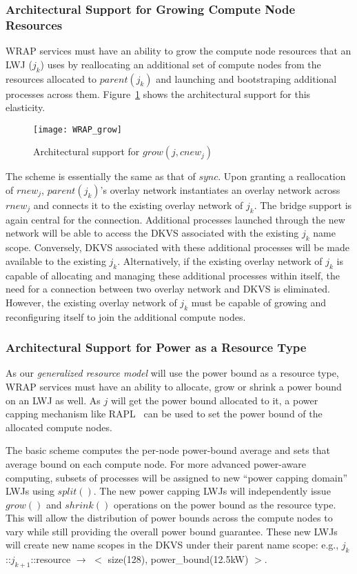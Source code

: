 \subsubsection{Architectural Support for Growing Compute Node Resources}
WRAP services must have an ability to grow the compute node resources that an LWJ ($j_k$)
uses by reallocating an additional set of compute nodes from the resources allocated
to $parent(j_k)$ and launching and bootstraping additional processes
across them.
Figure~\ref{fig:ext2} shows the architectural support for this elasticity. 
\begin{figure}
  \centering
    \texttt{[image: WRAP\_grow]}
  \caption{Architectural support for ${grow(j, cnew_j)}$}
  \label{fig:ext2}
\end{figure}
The scheme is essentially the same as that of $sync$.
Upon granting a reallocation of $rnew_j$,
$parent(j_k)$'s overlay network instantiates an overlay network
across $rnew_j$ and connects it to the existing overlay network
of $j_k$. The bridge support is again central for the connection.
Additional processes launched through the new network will
be able to access the DKVS associated with the existing $j_k$
name scope. Conversely, DKVS associated with these additional
processes will be made available to the existing $j_k$.
Alternatively, if the existing overlay network of $j_k$ is
capable of allocating and managing these additional processes
within itself, the need for a connection between two overlay
network and DKVS is eliminated. However, the existing overlay network
of $j_k$ must be capable of growing and
reconfiguring itself to join the additional compute nodes.

\subsubsection{Architectural Support for Power as a Resource Type}
As our {\em generalized resource model} will use the power bound as
a resource type, WRAP services must have an ability to allocate, grow
or shrink a power bound on an LWJ as well. 
As $j$ will get the power bound allocated to it, 
a power capping mechanism like RAPL~\cite{RountreeRAPL} can be used
to set the power bound of the allocated compute nodes.

The basic scheme computes the per-node power-bound average
and sets that average bound on each compute node.
For more advanced power-aware computing, subsets of processes will
be assigned to new ``power capping domain'' LWJs using $split()$.
The new power capping LWJs will independently issue $grow()$ and $shrink()$
operations on the power bound as the resource type.
This will allow the distribution of power bounds across the compute
nodes to vary while still providing the overall power bound guarantee.
These new LWJs will create new name scopes
in the DKVS under their parent name scope:
e.g., $j_k$::$j_{k+1}$::resource $\rightarrow$ $<$ size(128), power\_bound(12.5kW) $>$.

